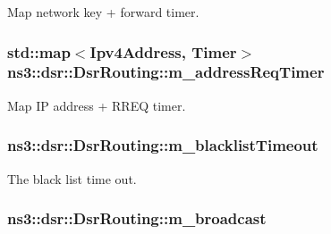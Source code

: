 Map network key + forward timer. 

\subsubsection[{\texorpdfstring{m\+\_\+address\+Req\+Timer}{m_addressReqTimer}}]{\setlength{\rightskip}{0pt plus 5cm}std\+::map$<${\bf Ipv4\+Address}, {\bf Timer}$>$ ns3\+::dsr\+::\+Dsr\+Routing\+::m\+\_\+address\+Req\+Timer\hspace{0.3cm}{\ttfamily [private]}}\hypertarget{classns3_1_1dsr_1_1DsrRouting_a47174823b0622573b681afc40d6ea558}{}\label{classns3_1_1dsr_1_1DsrRouting_a47174823b0622573b681afc40d6ea558}


Map IP address + R\+R\+EQ timer. 

\subsubsection[{\texorpdfstring{m\+\_\+blacklist\+Timeout}{m_blacklistTimeout}}]{ ns3\+::dsr\+::\+Dsr\+Routing\+::m\+\_\+blacklist\+Timeout\hspace{0.3cm}{\ttfamily [private]}}\hypertarget{classns3_1_1dsr_1_1DsrRouting_a07022fdee22444ddb4560c1f78bccaf2}{}\label{classns3_1_1dsr_1_1DsrRouting_a07022fdee22444ddb4560c1f78bccaf2}


The black list time out. 

\subsubsection[{\texorpdfstring{m\+\_\+broadcast}{m_broadcast}}]{ ns3\+::dsr\+::\+Dsr\+Routing\+::m\+\_\+broadcast\hspace{0.3cm}{\ttfamily [private]}}\hypertarget{classns3_1_1dsr_1_1DsrRouting_a52d4ef78c13236c73c60db85c0088ff6}{}\label{classns3_1_1dsr_1_1DsrRouting_a52d4ef78c13236c73c60db85c0088ff6}


